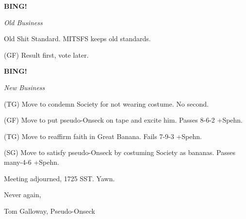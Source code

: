 \documentclass[12pt]{article}
\newcommand{\bing}{{\bf BING!} }
\newcommand{\goto}[1]{\bing \vskip 12pt \centerline{{\em{#1}}}}
\begin{document}
\goto{Old Business}

Old Shit Standard. MITSFS keeps old standards.

(GF) Result first, vote later.

\goto{New Business}

(TG) Move to condemn Society for not wearing costume. No second.

(GF) Move to put pseudo-Onseck on tape and excite him. Passes 8-6-2 +Spehn.

(TG) Move to reaffirm faith in Great Banana. Fails 7-9-3 +Spehn.

(SG) Move to satisfy pseudo-Onseck by costuming Society as bananas. Passes many-4-6 +Spehn.

\vspace{12pt}

\noindent
Meeting adjourned, 1725 SST. Yawn.

\vspace{18pt}

\centerline{Never again,}
\centerline{Tom Galloway, Pseudo-Onseck}
\end{document}
